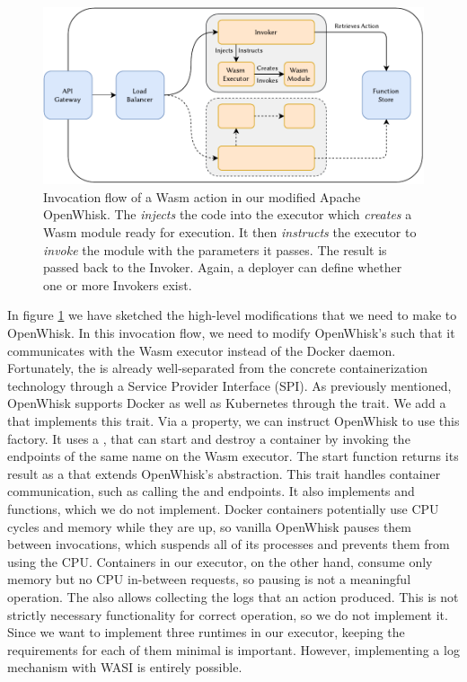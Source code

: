 \begin{figure}
    \centering
    \includegraphics[width=\textwidth]{figures/WasmOpenWhiskActionInvocationFlow.pdf}
    \caption{Invocation flow of a Wasm action in our modified Apache OpenWhisk. The  \emph{injects} the code into the executor which \emph{creates} a Wasm module ready for execution. It then \emph{instructs} the executor to \emph{invoke} the module with the parameters it passes. The result is passed back to the Invoker. Again, a deployer can define whether one or more Invokers exist.}
    \label{fig:wasm-openwhisk-action-invocation-flow}
\end{figure}

In figure \ref{fig:wasm-openwhisk-action-invocation-flow} we have sketched the high-level modifications that we need to make to OpenWhisk. In this invocation flow, we need to modify OpenWhisk's  such that it communicates with the Wasm executor instead of the Docker daemon. Fortunately, the  is already well-separated from the concrete containerization technology through a Service Provider Interface (SPI). As previously mentioned, OpenWhisk supports Docker as well as Kubernetes through the  trait. We add a  that implements this trait. Via a property, we can instruct OpenWhisk to use this factory. It uses a , that can start and destroy a container by invoking the endpoints of the same name on the Wasm executor. The start function returns its result as a  that extends OpenWhisk's  abstraction. This trait handles container communication, such as calling the  and  endpoints. It also implements  and  functions, which we do not implement. Docker containers potentially use CPU cycles and memory while they are up, so vanilla OpenWhisk pauses them between invocations, which suspends all of its processes and prevents them from using the CPU. Containers in our executor, on the other hand, consume only memory but no CPU in-between requests, so pausing is not a meaningful operation. The  also allows collecting the logs that an action produced. This is not strictly necessary functionality for correct operation, so we do not implement it. Since we want to implement three runtimes in our executor, keeping the requirements for each of them minimal is important. However, implementing a log mechanism with WASI is entirely possible.

